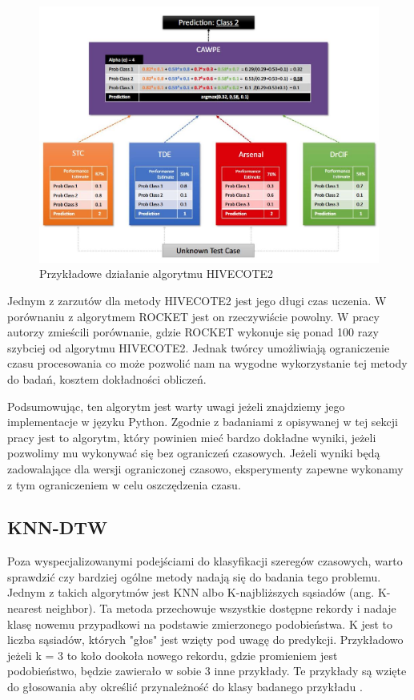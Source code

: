            \begin{figure}[H]
                \centering
                \captionsetup{justification=centering,margin=0.5cm}
                \includegraphics[scale=0.6]{figures/03-teoria/HIVE.JPG}
                \caption{Przykładowe działanie algorytmu HIVECOTE2 \cite{HiveCote}}
                \label{fig:hive_example}
            \end{figure}
            
            Jednym z zarzutów dla metody HIVECOTE2 jest jego długi czas uczenia. W porównaniu z algorytmem ROCKET jest on rzeczywiście powolny. W pracy autorzy zmieścili porównanie, gdzie ROCKET wykonuje się ponad 100 razy szybciej od algorytmu HIVECOTE2. Jednak twórcy umożliwiają ograniczenie czasu procesowania co może pozwolić nam na wygodne wykorzystanie tej metody do badań, kosztem dokładności obliczeń.
            
            Podsumowując, ten algorytm jest warty uwagi jeżeli znajdziemy jego implementacje w języku Python. Zgodnie z badaniami z opisywanej w tej sekcji pracy jest to algorytm, który powinien mieć bardzo dokładne wyniki, jeżeli pozwolimy mu wykonywać się bez ograniczeń czasowych. Jeżeli wyniki będą zadowalające dla wersji ograniczonej czasowo, eksperymenty zapewne wykonamy z tym ograniczeniem w celu oszczędzenia czasu.
        \subsection{KNN-DTW}
            Poza wyspecjalizowanymi podejściami do klasyfikacji szeregów czasowych, warto sprawdzić czy bardziej ogólne metody nadają się do badania tego problemu. Jednym z takich algorytmów jest KNN albo K-najbliższych sąsiadów (ang. K-nearest neighbor). Ta metoda przechowuje wszystkie dostępne rekordy i nadaje klasę nowemu przypadkowi na podstawie zmierzonego podobieństwa. K jest to liczba sąsiadów, których "głos"  jest wzięty pod uwagę do predykcji. Przykładowo jeżeli k = 3 to koło dookoła nowego rekordu, gdzie promieniem jest podobieństwo, będzie zawierało w sobie 3 inne przykłady. Te przykłady są wzięte do głosowania aby określić przynależność do klasy badanego przykładu \cite{Classification_theory}. 
            
